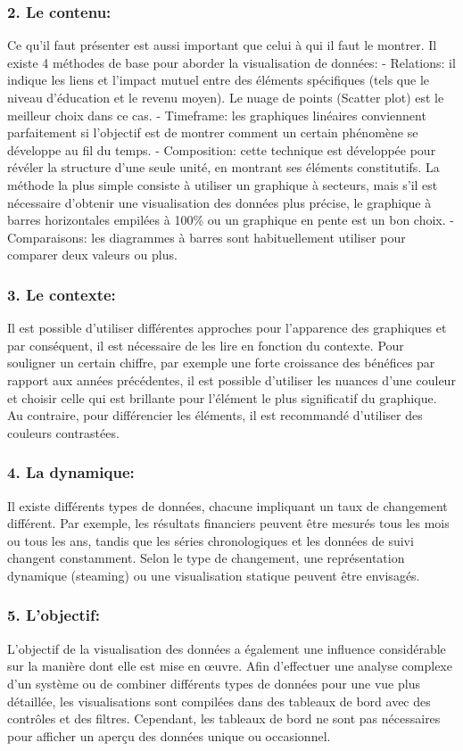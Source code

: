 \documentclass[french, a4paper, 12pt]{report}
\begin{document}
\subsubsection{2. Le contenu:}
Ce qu’il faut présenter est aussi important que celui à qui il faut le montrer. Il existe 4 méthodes de base pour aborder la visualisation de données:
- Relations: il indique les liens et l'impact mutuel entre des éléments spécifiques (tels que le niveau d'éducation et le revenu moyen). Le nuage de points (Scatter plot) est le meilleur choix dans ce cas.
- Timeframe: les graphiques linéaires conviennent parfaitement si l’objectif est de montrer comment un certain phénomène se développe au fil du temps.
- Composition: cette technique est développée pour révéler la structure d'une seule unité, en montrant ses éléments constitutifs. La méthode la plus simple consiste à utiliser un graphique à secteurs, mais s’il est nécessaire d’obtenir une visualisation des données plus précise, le graphique à barres horizontales empilées à 100\% ou un graphique en pente est un bon choix.
- Comparaisons: les diagrammes à barres sont habituellement utiliser pour  comparer deux valeurs ou plus.
\subsubsection{3. Le contexte: }
Il est possible d’utiliser différentes approches pour l'apparence des graphiques et par conséquent, il est nécessaire de les lire en fonction du contexte. Pour souligner un certain chiffre, par exemple une forte croissance des bénéfices par rapport aux années précédentes, il est possible d’utiliser les nuances d’une couleur et choisir celle qui est brillante pour l’élément le plus significatif du graphique. Au contraire, pour différencier les éléments, il est recommandé d’utiliser des couleurs contrastées.
\subsubsection{4. La dynamique:  }
Il existe différents types de données, chacune impliquant un taux de changement différent. Par exemple, les résultats financiers peuvent être mesurés tous les mois ou tous les ans, tandis que les séries chronologiques et les données de suivi changent constamment. Selon le type de changement, une représentation dynamique (steaming) ou une visualisation statique peuvent être envisagés.
\subsubsection{5. L’objectif:  }
L’objectif de la visualisation des données a également une influence considérable sur la manière dont elle est mise en œuvre. Afin d'effectuer une analyse complexe d'un système ou de combiner différents types de données pour une vue plus détaillée, les visualisations sont compilées dans des tableaux de bord avec des contrôles et des filtres. Cependant, les tableaux de bord ne sont pas nécessaires pour afficher un aperçu des données unique ou occasionnel.
\end{document}
